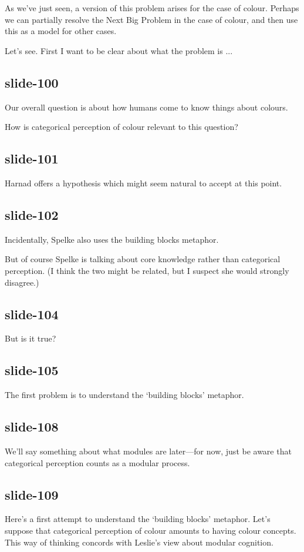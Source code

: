 \documentclass[12pt,\papersize]{extarticle}
\begin{document}
As we've just seen, a version of this problem arises for the case of colour.
Perhaps we can partially resolve the Next Big Problem in the case of colour, and then use
this as a model for other cases.

Let's see.
First I want to be clear about what the problem is ...

\subsection{slide-100}
Our overall question is about how humans come to know things about colours.

How is categorical perception of colour relevant to this question?

\subsection{slide-101}
Harnad offers a hypothesis which might seem natural to accept at this point.

\subsection{slide-102}
Incidentally, Spelke also uses the building blocks metaphor.

But of course Spelke is talking about core knowledge rather than categorical perception.  (I think the two might be related, but I suspect she would strongly disagree.)

\subsection{slide-104}
But is it true?

\subsection{slide-105}
The first problem is to understand the ‘building blocks’ metaphor.

\subsection{slide-108}
We'll say something about what modules are later---for now, just be aware that categorical perception counts as a modular process.

\subsection{slide-109}
Here's a first attempt to understand the ‘building blocks’ metaphor.
Let's suppose that categorical perception of colour amounts to having colour concepts.
This way of thinking concords with Leslie's view about modular cognition.
\end{document}
